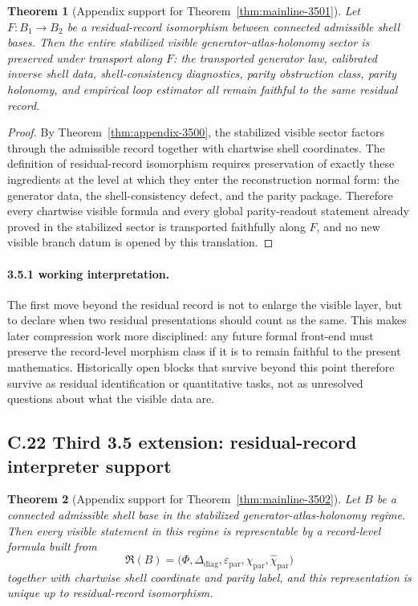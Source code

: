\documentclass[12pt,a4paper]{article}
\newtheorem{theorem}{Theorem}[section]
\begin{document}
\begin{theorem}[Appendix support for Theorem~\ref{thm:mainline-3501}]
\label{thm:appendix-3501}
Let $F:B_1\to B_2$ be a residual-record isomorphism between connected admissible shell bases. Then the entire stabilized visible generator-atlas-holonomy sector is preserved under transport along $F$: the transported generator law, calibrated inverse shell data, shell-consistency diagnostics, parity obstruction class, parity holonomy, and empirical loop estimator all remain faithful to the same residual record.
\end{theorem}

\begin{proof}
By Theorem~\ref{thm:appendix-3500}, the stabilized visible sector factors through the admissible record together with chartwise shell coordinates. The definition of residual-record isomorphism requires preservation of exactly these ingredients at the level at which they enter the reconstruction normal form: the generator data, the shell-consistency defect, and the parity package. Therefore every chartwise visible formula and every global parity-readout statement already proved in the stabilized sector is transported faithfully along $F$, and no new visible branch datum is opened by this translation.
\end{proof}

\paragraph{3.5.1 working interpretation.}
The first move beyond the residual record is not to enlarge the visible layer, but to declare when two residual presentations should count as the same. This makes later compression work more disciplined: any future formal front-end must preserve the record-level morphism class if it is to remain faithful to the present mathematics. Historically open blocks that survive beyond this point therefore survive as residual identification or quantitative tasks, not as unresolved questions about what the visible data are.


\subsection*{C.22 Third 3.5 extension: residual-record interpreter support}

\begin{theorem}[Appendix support for Theorem~\ref{thm:mainline-3502}]
\label{thm:appendix-3502}
Let $B$ be a connected admissible shell base in the stabilized generator-atlas-holonomy regime. Then every visible statement in this regime is representable by a record-level formula built from
\[
 \mathfrak R(B)=\bigl(\Phi,\Delta_{\mathrm{diag}},\varepsilon_{\mathrm{par}},\chi_{\mathrm{par}},\widehat\chi_{\mathrm{par}}\bigr)
\]
together with chartwise shell coordinate and parity label, and this representation is unique up to residual-record isomorphism.
\end{theorem}
\end{document}
